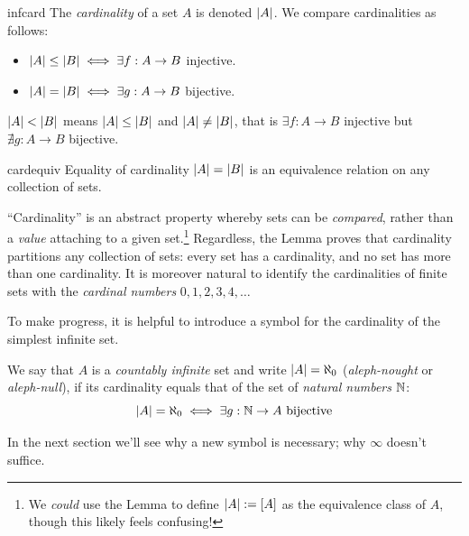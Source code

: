 \begin{defn}{}{infcard}
	The \emph{cardinality} of a set $A$ is denoted $\left| A\right|$. We compare cardinalities as follows:
	\begin{itemize}
  	\item $\left| A\right|\le\left| B\right|\iff\exists f:A\to B$ injective.
  	\item $\left| A\right|=\left| B\right|\iff\exists g:A\to B$ bijective.
	\end{itemize}
	$\left| A\right|<\left| B\right|$ means $\left| A\right|\le \left| B\right|$ and $\left| A\right|\neq \left| B\right|$, that is $\exists f:A\to B$ injective but $\nexists g:A\to B$ bijective.
\end{defn}

\begin{lemm}{}{cardequiv}
	Equality of cardinality $\left| A\right|=\left| B\right|$ is an equivalence relation on any collection of sets.
\end{lemm}

``Cardinality'' is an abstract property whereby sets can be \emph{compared}, rather than a \emph{value} attaching to a given set.\footnote{We \emph{could} use the Lemma to define $\left| A\right|:=[A]$ as the equivalence class of $A$, though this likely feels confusing!} Regardless, the Lemma proves that cardinality partitions any collection of sets: every set has a cardinality, and no set has more than one cardinality. It is moreover natural to identify the cardinalities of finite sets with the \emph{cardinal numbers} $0,1,2,3,4,\ldots$

\goodbreak





To make progress, it is helpful to introduce a symbol for the cardinality of the simplest infinite set.

\begin{defn}{}{}
	We say that $A$ is a \emph{countably infinite\footnotemark} set and write $\left| A\right|=\aleph_0$ (\emph{aleph-nought} or \emph{aleph-null}), if its cardinality equals that of the set of \emph{natural numbers} $\mathbb{N}$:
	\[
		\left| A\right|=\aleph_0 \iff \exists g:\mathbb{N}\to A\text{ bijective}
	\]
\end{defn}


In the next section we'll see why a new symbol is necessary; why $\infty$ doesn't suffice.

